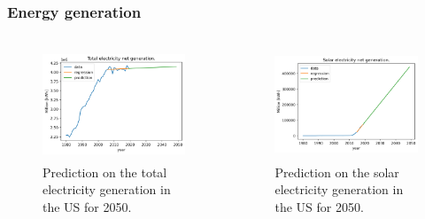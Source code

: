 \begin{frame}
\frametitle{Energy generation}
\begin{columns}
    \column[t]{5cm}
	\begin{figure}[htbp!]
		\begin{center}
			\includegraphics[height=3.3cm]{images/us-prediction1}
		\end{center}
		\caption{Prediction on the total electricity generation in the US for 2050.}
	\end{figure}

    \column[t]{5cm}
	\begin{figure}[htbp!]
		\begin{center}
			\includegraphics[height=3.3cm]{images/us-prediction2}
		\end{center}
		\caption{Prediction on the solar electricity generation in the US for 2050.}
	\end{figure}
\end{columns}
\end{frame}


